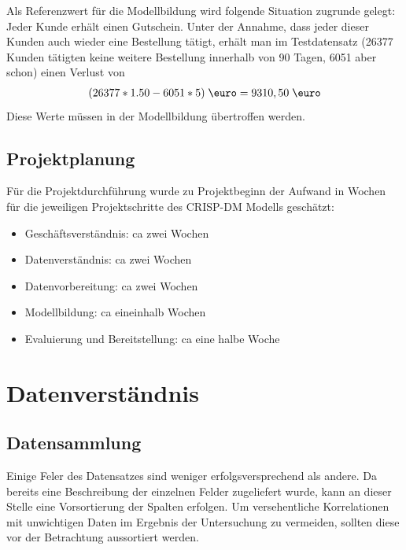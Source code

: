 \documentclass[a4paper,12pt]{article}
\begin{document}
Als Referenzwert\label{Referenzwerte} für die Modellbildung wird folgende Situation
zugrunde gelegt: Jeder Kunde erhält einen Gutschein. Unter der Annahme, dass jeder dieser Kunden auch wieder eine Bestellung tätigt, erhält man im Testdatensatz (26377 Kunden tätigten keine weitere Bestellung innerhalb von 90 Tagen, 6051 aber schon) einen Verlust von
\begin{align}
(26377 *1.50 - 6051*5)\;\text{\euro} = 9310,50\;\text{\euro}\label{gl1}
\end{align}
Diese Werte müssen in der Modellbildung übertroffen werden.

\subsection{Projektplanung}
Für die Projektdurchführung wurde zu Projektbeginn der Aufwand in
Wochen für die jeweiligen Projektschritte des CRISP-DM Modells geschätzt:
\begin{itemize}
	\item Geschäftsverständnis: ca zwei Wochen
	\item Datenverständnis: ca zwei Wochen
	\item Datenvorbereitung: ca zwei Wochen
	\item Modellbildung: ca eineinhalb Wochen
	\item Evaluierung und Bereitstellung: ca eine halbe Woche
\end{itemize}

\section{Datenverständnis}
\subsection{Datensammlung}
Einige Feler des Datensatzes sind weniger erfolgsversprechend als andere. Da bereits eine
Beschreibung der einzelnen Felder zugeliefert wurde, kann an dieser Stelle eine Vorsortierung
der Spalten erfolgen. Um versehentliche Korrelationen mit unwichtigen Daten im Ergebnis der
Untersuchung zu vermeiden, sollten diese vor der Betrachtung aussortiert werden.
\end{document}
